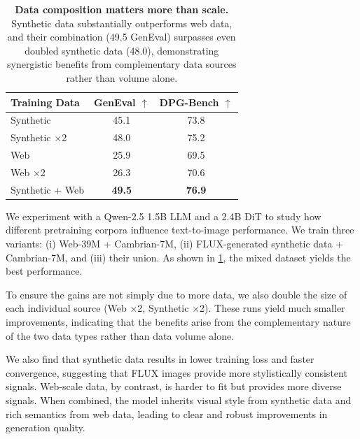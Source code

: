 \documentclass[10pt,twocolumn,letterpaper]{article}
\begin{document}
\begin{table}[t]
    \centering
    \small
    \caption{
        \textbf{Data composition matters more than scale.}
        Synthetic data substantially outperforms web data, and their combination (49.5 GenEval) surpasses even doubled synthetic data (48.0), demonstrating synergistic benefits from complementary data sources rather than volume alone.
    }\label{tab:data_recipe}
    \begin{tabular}{lcc}
        \toprule
        \textbf{Training Data} & \textbf{GenEval} $\uparrow$ & \textbf{DPG-Bench} $\uparrow$ \\
        \midrule
        Synthetic & 45.1 & 73.8 \\
        Synthetic $\times$2 & 48.0 & 75.2 \\
        \midrule
        Web & 25.9 & 69.5 \\
        Web $\times$2 & 26.3 & 70.6 \\
        \midrule
        \rowcolor{green!10}
        Synthetic + Web & \textbf{49.5} & \textbf{76.9} \\
        \bottomrule
    \end{tabular}
    \vspace{-0.5em}
\end{table}


We experiment with a Qwen-2.5 1.5B LLM and a 2.4B DiT to study how different pretraining corpora influence text-to-image performance. 
We train three variants: (i) Web-39M + Cambrian-7M, (ii) FLUX-generated synthetic data + Cambrian-7M, and (iii) their union. 
As shown in \cref{tab:data_recipe}, the mixed dataset yields the best performance.

To ensure the gains are not simply due to more data, we also double the size of each individual source (Web ×2, Synthetic ×2). 
These runs yield much smaller improvements, indicating that the benefits arise from the complementary nature of the two data types rather than data volume alone.

We also find that synthetic data results in lower training loss and faster convergence, suggesting that FLUX images provide more stylistically consistent signals. 
Web-scale data, by contrast, is harder to fit but provides more diverse signals. 
When combined, the model inherits visual style from synthetic data and rich semantics from web data, leading to clear and robust improvements in generation quality.
\end{document}
